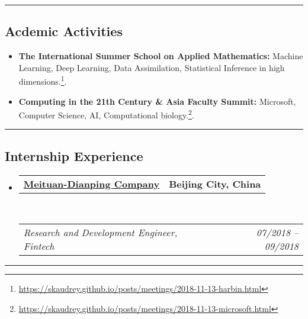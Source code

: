 \documentclass[10pt,letterpaper]{article}
\makeatletter
\newcommand{\headerrow}[2]
{\begin{tabular*}{\linewidth}{l@{\extracolsep{\fill}}r}
	#1 &
	#2 \\
\end{tabular*}}
\makeatother
\begin{document}
\hrule
\vspace{-0.4em}
\subsection*{Acdemic Activities}

\begin{itemize}
	\parskip=0.1em
	
	\item \textbf{The International Summer School on Applied Mathematics:} Machine Learning, Deep Learning, Data Assimilation, Statistical Inference in high dimensions.\footnote{\url{https://skaudrey.github.io/posts/meetings/2018-11-13-harbin.html}}.
	
	\item \textbf{Computing in the 21th Century \& Asia Faculty Summit:} Microsoft, Computer Science, AI, Computational biology.\footnote{\url{https://skaudrey.github.io/posts/meetings/2018-11-13-microsoft.html}}.

\end{itemize}

\hrule
\vspace{-0.4em}
\subsection*{Internship Experience}

\begin{itemize}
	\parskip=0.1em
	
	\item
	\headerrow
		{\textbf{\href{https://about.meituan.com/}{Meituan-Dianping Company}}}
		{\textbf{Beijing City, China}}
	\\
	\headerrow
		{\emph{Research and Development Engineer, Fintech}}
		{\emph{07/2018 -- 09/2018}}

\end{itemize}


\hrule
\vspace{-0.4em}
\end{document}
